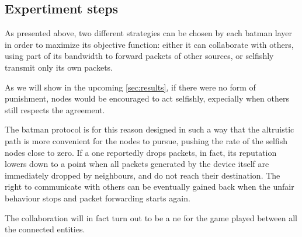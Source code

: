 \documentclass[conference,10.5pt]{IEEEtran}
\begin{document}
\begin{table}[h]
\vspace{0.1cm}
\caption{Relevant parameters for building the network}
\label{tab:params}
\end{table}

\subsection{Expertiment steps}

As presented above, two different strategies can be chosen by each \gls{batman} layer in order to maximize its objective function: either it can collaborate with others, using part of its bandwidth to forward packets of other sources, or selfishly transmit only its own packets.

As we will show in the upcoming \autoref{sec:results}, if there were no form of punishment, nodes would be encouraged to act selfishly, expecially when others still respects the agreement.

The \gls{batman} protocol is for this reason designed in such a way that the altruistic path is more convenient for the nodes to pursue, pushing the rate of the selfish nodes close to zero.
If a one reportedly drops packets, in fact, its reputation lowers down to a point when all packets generated by the device itself are immediately dropped by neighbours, and do not reach their destination. The right to communicate with others can be eventually gained back when the unfair behaviour stops and packet forwarding starts again.

The collaboration will in fact turn out to be a \gls{ne} for the game played between all the connected entities.
\end{document}
